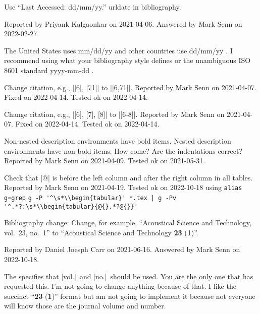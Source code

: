 Use ``Last Accessed: dd/mm/yy.'' urldate in bibliography.
{\small
  Reported by Priyank Kalgaonkar on 2021-04-06.
  Answered by Mark Senn on 2022-02-27.

  The United States uses mm/dd/yy and other countries use dd/mm/yy
  \cite{cms17-ambiguous-dates}.
  I recommend using what your bibliography style defines
  or the unambiguous ISO 8601 standard yyyy-mm-dd
  \cite{cms17-iso-dates}.%
}

Change citation, e.g., |[6], [71]| to |[6,71]|.
{\small
  Reported by Mark Senn on 2021-04-07.
  Fixed on 2022-04-14.
  Tested ok on 2022-04-14.%
}

Change citation, e.g., |[6], [7], [8]| to |[6-8]|.
{\small
  Reported by Mark Senn on 2021-04-07.
  Fixed on 2022-04-14.
  Tested ok on 2022-04-14.%
}

Non-nested description environments have bold items.
Nested description environments have non-bold items.
How come?
Are the indentations correct?
{\small
  Reported by Mark Senn on 2021-04-09.
  Tested ok on 2021-05-31.%
}

Check that |@{}| is before the left column
and after the right column in all tables.
{\small
  Reported by Mark Senn on 2021-04-19.
  Tested ok on 2022-10-18 using\hfil\break
  \verb+alias g=grep+\hfil\break
  \verb+g -P '^\s*\\begin{tabular}' *.tex | g -Pv '^.*?:\s*\\begin{tabular}{@{}.*?@{}}'+%
}

Bibliography change:
Change,
for example,
``Acoustical Science and Technology, vol.~23, no.~1''
to
``Acoustical Science and Technology {\bfseries 23\/} ({\bfseries 1\/})''.
{\small
  Reported by Daniel Joesph Carr on 2021-06-16.
  Answered by Mark Senn on 2022-10-18.

  The
  \cite[page~12]{ieee-reference-guide}
  specifies that |vol.|~and |no.|~should be used.
  You are the only one that has requested this.
  I'm not going to change anything because of that.
  I like the succinct ``{\bfseries 23\/} ({\bfseries 1\/})''
  format but am not going to implement it because not
  everyone will know those are the journal volume and number.
}


